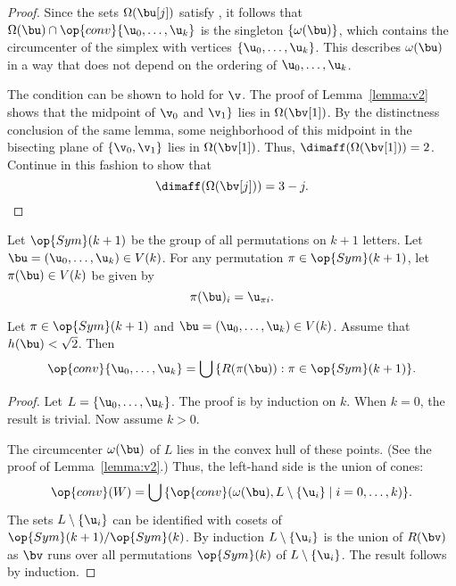 \begin{proof} 
Since the sets $\Omega(\bu[j])$ satisfy , it
follows that $\Omega(\bu)\cap \op{conv}\{ \u_0,\ldots, \u_k\}$ is
the singleton $\{\omega(\bu)\}$, which contains the circumcenter of
the simplex with vertices $\{ \u_0,\ldots, \u_k\}$.  This describes
$\omega(\bu)$ in a way that does not depend on the ordering of $
\u_0,\ldots, \u_k$.

The condition  can be shown to hold for $\v$.
The proof of Lemma~\ref{lemma:v2} shows that the midpoint of $\v_0$
and $\v_1\}$ lies in $\Omega(\bv[1])$.  By the distinctness
conclusion of the same lemma, some neighborhood of this midpoint in
the bisecting plane of $\{\v_0,\v_1\}$ lies in $\Omega(\bv[1])$.
Thus, $\dimaff(\Omega(\bv[1]))=2$.  Continue in this fashion to show
that
\begin{displaymath}
\dimaff(\Omega(\bv[j]))=3-j.\end{displaymath}
\end{proof}

Let $\op{Sym}(k+1)$ be the group of all permutations on $k+1$ letters.
Let $\bu = ( \u_0,\ldots, \u_k)\in V(k)$.  For any permutation
$\pi\in\op{Sym}(k+1)$, let $\pi(\bu)\in V(k)$ be given by
\begin{displaymath}
\pi(\bu)_i =  \u_{\pi i}.
\end{displaymath}   

\begin{lemma}\label{lemma:Rconv}  Let $\pi\in\op{Sym}(k+1)$
and $\bu = ( \u_0,\ldots, \u_k)\in V(k)$.  Assume that
$h(\bu)<\sqrt2$. Then
\begin{displaymath}
\op{conv}\{ \u_0,\ldots, \u_k\} = \bigcup \,\{ R(\pi(\bu)) : \pi\in \op{Sym}(k+1)\}.
\end{displaymath}
\end{lemma}
%

\begin{proof} Let $L = \{ \u_0,\ldots, \u_k\}$.  The proof is by
induction on $k$.  When $k=0$, the result is trivial.  Now assume
$k>0$.

The circumcenter $\omega(\bu)$ of $L$ lies in the convex hull of
these points.  (See the proof of Lemma~\ref{lemma:v2}.)  Thus, the
left-hand side is the union of cones:
\begin{displaymath}
\op{conv}(W) = \bigcup\,\{ \op{conv}(\omega(\bu),L\setminus \{ \u_i\}\mid i=0,\ldots,k) \}.
\end{displaymath}
The sets $L\setminus \{ \u_i\}$ can be identified with cosets of
$\op{Sym}(k+1) /\op{Sym}(k)$.  By induction $L\setminus \{ \u_i\}$ is
the union of $R(\bv)$ as $\bv$ runs over all permutations
$\op{Sym}(k)$ of $L\setminus \{ \u_i\}$.  The result follows by
induction.
\end{proof}

